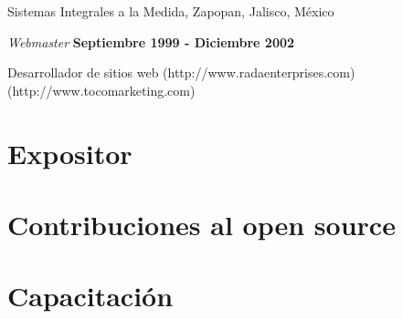 \blankline

Sistemas Integrales a la Medida, Zapopan, Jalisco, México
\begin{outerlist}
\item[] \textit{Webmaster }%
    \hfill \textbf{Septiembre 1999 - Diciembre 2002 }
    \begin{innerlist}
        \item Desarrollador de sitios web
              (http://www.radaenterprises.com) \\
              (http://www.tocomarketing.com)
    \end{innerlist}
\end{outerlist}

\blankline

\section{Expositor}


\section{Contribuciones al open source}


\section{Capacitación}

\blankline

